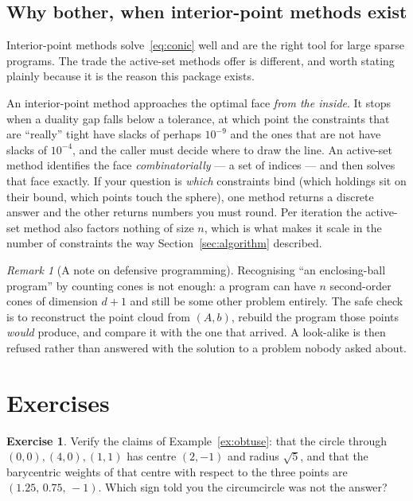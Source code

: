 \documentclass[11pt,a4paper]{article}
\theoremstyle{plain}
\theoremstyle{definition}
\newtheorem{exercise}{Exercise}
\theoremstyle{remark}
\newtheorem*{remark}{Remark}
\begin{document}
\subsection{Why bother, when interior-point methods exist}

Interior-point methods solve~\eqref{eq:conic} well and are the right tool for
large sparse programs. The trade the active-set methods offer is different, and
worth stating plainly because it is the reason this package exists.

An interior-point method approaches the optimal face \emph{from the inside}. It
stops when a duality gap falls below a tolerance, at which point the constraints
that are ``really'' tight have slacks of perhaps $10^{-9}$ and the ones that are
not have slacks of $10^{-4}$, and the caller must decide where to draw the line.
An active-set method identifies the face \emph{combinatorially} --- a set of
indices --- and then solves that face exactly. If your question is
\emph{which} constraints bind (which holdings sit on their bound, which points
touch the sphere), one method returns a discrete answer and the other returns
numbers you must round. Per iteration the active-set method also factors nothing
of size $n$, which is what makes it scale in the number of constraints the way
Section~\ref{sec:algorithm} described.

\begin{remark}[A note on defensive programming]
  Recognising ``an enclosing-ball program'' by counting cones is not enough: a
  program can have $n$ second-order cones of dimension $d+1$ and still be some
  other problem entirely. The safe check is to reconstruct the point cloud from
  $(A,b)$, rebuild the program those points \emph{would} produce, and compare it
  with the one that arrived. A look-alike is then refused rather than answered
  with the solution to a problem nobody asked about.
\end{remark}

\section{Exercises}
\label{sec:exercises}

\begin{exercise}
  \label{ex:circum}
  Verify the claims of Example~\ref{ex:obtuse}: that the circle through
  $(0,0),(4,0),(1,1)$ has centre $(2,-1)$ and radius $\sqrt5$, and that the
  barycentric weights of that centre with respect to the three points are
  $(1.25,\,0.75,\,-1)$. Which sign told you the circumcircle was not the answer?
\end{exercise}
\end{document}
